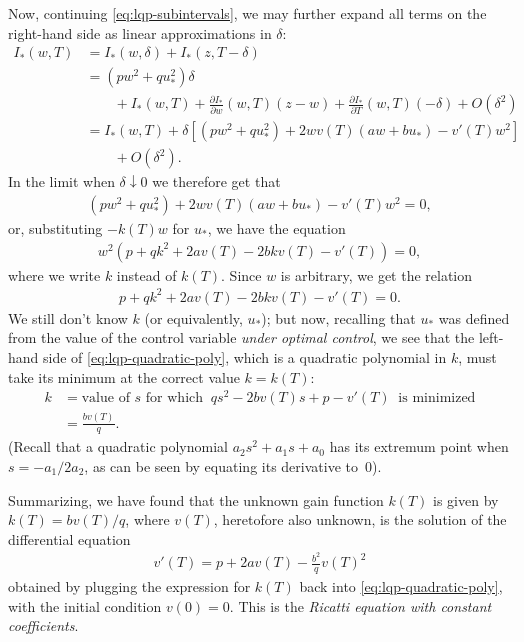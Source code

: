 \documentclass[12pt]{amsart}
\newcommand{\eq}[1]{\begin{equation}\begin{split}#1\end{split}\end{equation}}
\newcommand{\eqst}[1]{\begin{align*}#1\end{align*}}
\newcommand{\pder}[2]{\frac{\partial#1}{\partial#2}}
\begin{document}
Now, continuing \eqref{eq:lqp-subintervals}, we may further expand all terms on the right-hand side as linear approximations in $\delta$:
\eqst{
I_*(w,T) &= I_*(w,\delta) + I_*(z,T-\delta)
\\ &= (p w^2 + q u_*^2)\delta \\ & \qquad +
I_*(w,T) + \pder{I_*}{w}(w,T)(z-w) + \pder{I_*}{T}(w,T)(-\delta) + O(\delta^2)
\\ &=
I_*(w,T) + \delta\left[
(p w^2+qu_*^2) + 2w v(T)(aw+b u_*) - v'(T) w^2
\right]
 \\ & \qquad + O(\delta^2).
}
In the limit when $\delta\downarrow 0$ we therefore get that
\eqst{
(p w^2+qu_*^2) + 2w v(T)(aw+b u_*) - v'(T) w^2 = 0,
}
or, substituting $-k(T)w$ for $u_*$, we have the equation
\eqst{
w^2\left(
p + q k^2 + 2av(T) -2 b k v(T) -v'(T)
\right) = 0,
}
where we write $k$ instead of $k(T)$. Since $w$ is arbitrary, we get the relation
\eq{ \label{eq:lqp-quadratic-poly}
p + q k^2 + 2av(T) -2 b k v(T) -v'(T) = 0.
}
We still don't know $k$ (or equivalently, $u_*$); but now, recalling that $u_*$ was defined from the value of the control variable \emph{under optimal control}, we see that the left-hand side of \eqref{eq:lqp-quadratic-poly}, which is a quadratic polynomial in $k$, must take its minimum at the correct value $k=k(T)$:
\eqst{
k &= \textrm{value of $s$ for which }\  qs^2-2b v(T) s + p-v'(T)\ \textrm{ is minimized}
\\ &= \frac{b v(T)}{q}.
}
(Recall that a quadratic polynomial $a_2s^2+a_1s+a_0$ has its extremum point when $s=-a_1/2a_2$, as can be seen by equating its derivative to~$0$).

Summarizing, we have found that the unknown gain function $k(T)$ is given by $k(T) = b v(T)/q$, where $v(T)$, heretofore also unknown, is the solution of the differential equation
\eq{ \label{eq:lqp-ricatti1}
v'(T) = p + 2 a v(T) - \frac{b^2}{q} v(T)^2
}
obtained by plugging the expression for $k(T)$ back into \eqref{eq:lqp-quadratic-poly}, with the initial condition $v(0)=0$. This is the \emph{Ricatti equation with constant coefficients}.
\end{document}
